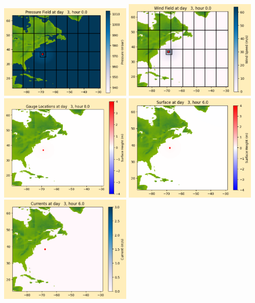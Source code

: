 \documentclass[11pt]{article}
\begin{document}
\includegraphics[width=0.475\textwidth]{frame0024fig1012.png}
\vskip 10pt 
\includegraphics[width=0.475\textwidth]{frame0024fig1013.png}
\includegraphics[width=0.475\textwidth]{frame0024fig1014.png}
\vskip 10pt 
\includegraphics[width=0.475\textwidth]{frame0025fig1001.png}
\includegraphics[width=0.475\textwidth]{frame0025fig1002.png}
\end{document}
